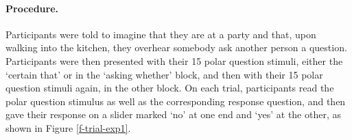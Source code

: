 \documentclass[11pt,fleqn]{article}
\newcommand{\6}{\mbox{$[\hspace*{-.6mm}[$}}
\newcommand{\9}{\mbox{$]\hspace*{-.6mm}]$}}
\begin{document}
%
%
%
%
%
%
%
%
%
%
%
%
%
%
%
%
%
%
%
%
%
%
%    
%
%
%
%

\paragraph{Procedure.} Participants were told to imagine that they are at a party and that, upon walking into the kitchen, they overhear somebody ask another person a question. Participants were then presented with their 15 polar question stimuli, either the `certain that' or in the `asking whether' block, and then with their 15 polar question stimuli again, in the other block. On each trial, participants read the polar question stimulus as well as the corresponding response question, and then gave their response on a slider marked `no' at one end and `yes' at the other, as shown in Figure \ref{f-trial-exp1}.  
\end{document}
